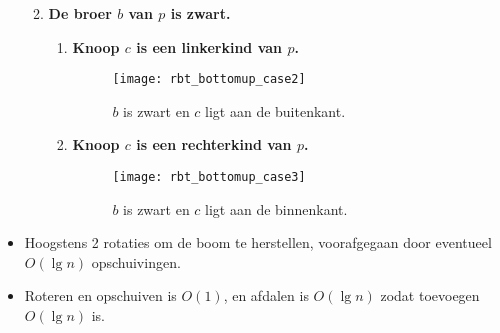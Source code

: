 \begin{itemize}
\begin{enumerate}
\begin{itemize}
        \end{itemize}
        \item \textbf{De broer $b$ van $p$ is zwart.}
        \begin{enumerate}
            \item \textbf{Knoop $c$ is een linkerkind van $p$.}
            \begin{figure}[ht]
                \centering
                \texttt{[image: rbt\_bottomup\_case2]}
                \caption{$b$ is zwart en $c$ ligt aan de buitenkant.}
                \label{fig:rbt_bottomup_case2}
            \end{figure}
            \item \textbf{Knoop $c$ is een rechterkind van $p$.}
            \begin{figure}[ht]
                \centering
                \texttt{[image: rbt\_bottomup\_case3]}
                \caption{$b$ is zwart en $c$ ligt aan de binnenkant.}
                \label{fig:rbt_bottomup_case3}
            \end{figure}
        \end{enumerate}
    \end{enumerate}
    \item Hoogstens 2 rotaties om de boom te herstellen, voorafgegaan door eventueel $O(\lg n)$ opschuivingen.
    \item Roteren en opschuiven is $O(1)$, en afdalen is $O(\lg n)$ zodat toevoegen $O(\lg n)$ is.
\end{itemize}


